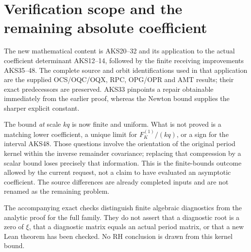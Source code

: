 \documentclass[11pt,a4paper]{article}
\begin{document}
\section{Verification scope and the remaining absolute coefficient}
\label{sec:AKS-scope}

The new mathematical content is AKS20--32 and its application to the
actual coefficient determinant AKS12--14, followed by the finite
receiving improvements AKS35--48. The complete source and orbit
identifications used in that application are the supplied OCS/OQC/OQX,
RPC, OPG/OPR and AMT results; their exact predecessors are preserved.
AKS33 pinpoints a repair obtainable immediately from the earlier proof,
whereas the Newton bound supplies the sharper explicit constant.

The bound \emph{at} scale $kq$ is now finite and uniform. What is not
proved is a matching lower coefficient, a unique limit for
$F_K^{(1)}/(kq)$, or a sign for the interval AKS48. Those questions involve
the orientation of the original period kernel within the inverse
remainder covariance; replacing that compression by a scalar bound
loses precisely that information. This is the finite-bounds outcome
allowed by the current request, not a claim to have evaluated an
asymptotic coefficient. The source differences are already completed
inputs and are not renamed as the remaining problem.

The accompanying exact checks distinguish finite algebraic diagnostics
from the analytic proof for the full family. They do not assert that a
diagnostic root is a zero of $\xi$, that a diagnostic matrix equals an
actual period matrix, or that a new Lean theorem has been checked.
No RH conclusion is drawn from this kernel bound.


\clearpage
\end{document}
